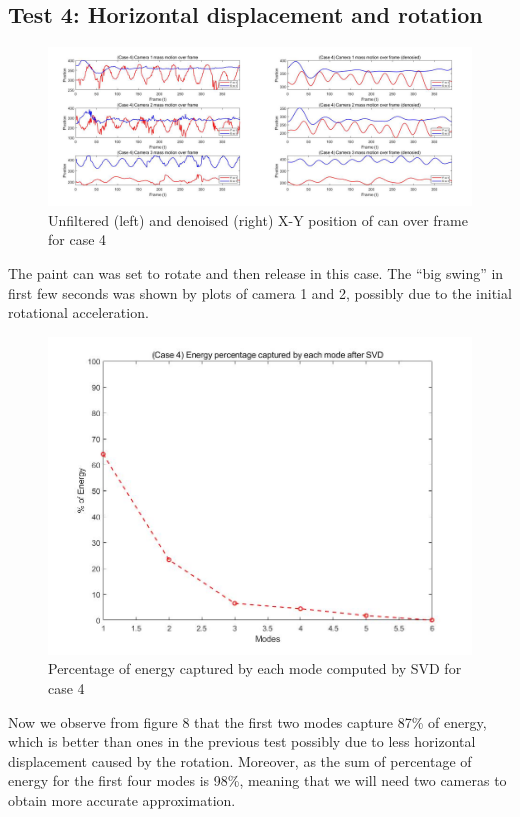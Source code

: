 \documentclass[11pt,a4paper]{article}
\numberwithin{equation}{subsection}
\begin{document}
\subsection{Test 4: Horizontal displacement and rotation}
\begin{figure}[H]
\begin{center}
\includegraphics[scale=0.20]{f7.jpg}
\caption{Unfiltered (left) and denoised (right) X-Y position of can over frame for case 4}
\end{center}
\end{figure}
The paint can was set to rotate and then release in this case. The ``big swing'' in first few seconds was shown by plots of camera 1 and 2, possibly due to the initial rotational acceleration.
\begin{figure}[H]
\begin{center}
\includegraphics[scale=0.20]{f8.jpg}
\caption{Percentage of energy captured by each mode computed by SVD for case 4}
\end{center}
\end{figure}
Now we observe from figure 8 that the first two modes capture 87\% of energy, which is better than ones in the previous test possibly due to less horizontal displacement caused by the rotation. Moreover, as the sum of percentage of energy for the first four modes is 98\%, meaning that we will need two cameras to obtain more accurate approximation.
\end{document}
